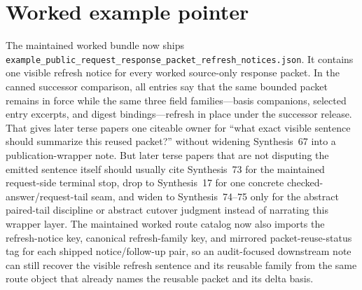 \documentclass[11pt]{article}
\begin{document}
\section{Worked example pointer}
The maintained worked bundle now ships \nolinkurl{example_public_request_response_packet_refresh_notices.json}.\cite{series:workedexample}
It contains one visible refresh notice for every worked source-only response packet.
In the canned successor comparison, all entries say that the same bounded packet remains in force while the same three field families---basis companions, selected entry excerpts, and digest bindings---refresh in place under the successor release.
That gives later terse papers one citeable owner for ``what exact visible sentence should summarize this reused packet?'' without widening Synthesis~67 into a publication-wrapper note. But later terse papers that are not disputing the emitted sentence itself should usually cite Synthesis~73 for the maintained request-side terminal stop, drop to Synthesis~17 for one concrete checked-answer/request-tail seam, and widen to Synthesis~74--75 only for the abstract paired-tail discipline or abstract cutover judgment instead of narrating this wrapper layer. The maintained worked route catalog now also imports the refresh-notice key, canonical refresh-family key, and mirrored packet-reuse-status tag for each shipped notice/follow-up pair, so an audit-focused downstream note can still recover the visible refresh sentence and its reusable family from the same route object that already names the reusable packet and its delta basis.
\end{document}
